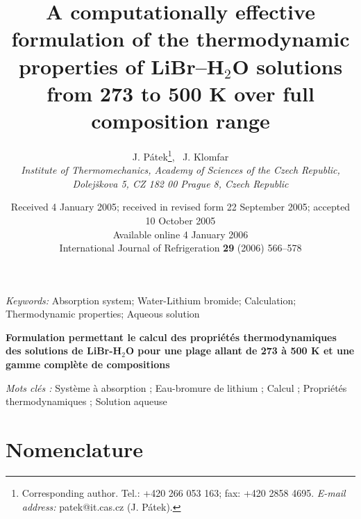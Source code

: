 \documentclass[11pt]{article}
\begin{document}
\title{A computationally effective formulation of the thermodynamic
       properties of LiBr--H$_2$O solutions from 273 to 500 K over
       full composition range}
\author{J. P\'atek\thanks{Corresponding author. Tel.: +420 266 053 163;
        fax: +420 2858 4695. \textit{E-mail address:}
        patek@it.cas.cz (J. P\'atek).},
        \ J. Klomfar \\[4pt]
        \small\itshape Institute of Thermomechanics, Academy of Sciences
        of the Czech Republic, \\
        \small\itshape Dolej\v{s}kova 5, CZ 182 00 Prague 8, Czech Republic}
\date{\small Received 4 January 2005; received in revised form
      22 September 2005; accepted 10 October 2005 \\
      Available online 4 January 2006 \\[6pt]
      \normalsize International Journal of Refrigeration
      \textbf{29} (2006) 566--578}
\maketitle

\begin{abstract}
\end{abstract}

\noindent\textit{Keywords:} Absorption system; Water-Lithium bromide;
Calculation; Thermodynamic properties; Aqueous solution

\vspace{1em}
\begin{center}
\large\bfseries Formulation permettant le calcul des propri\'et\'es
thermodynamiques des solutions de LiBr-H$_2$O pour une plage allant
de 273 \`a 500 K et une gamme compl\`ete de compositions
\end{center}

\noindent\textit{Mots cl\'es :} Syst\`eme \`a absorption ;
Eau-bromure de lithium ; Calcul ; Propri\'et\'es thermodynamiques ;
Solution aqueuse

\section*{Nomenclature}
\end{document}
